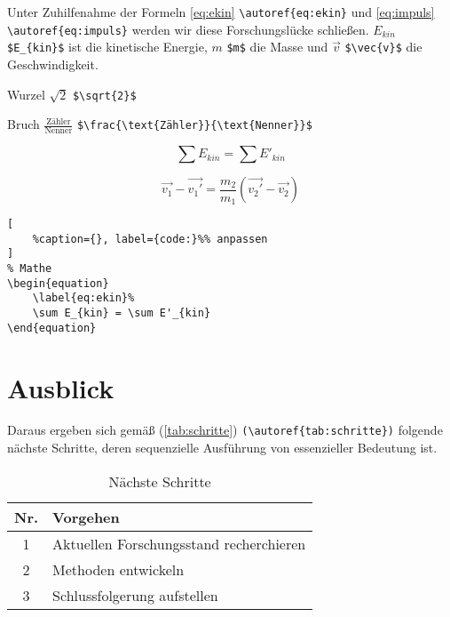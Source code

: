 Unter Zuhilfenahme der Formeln \autoref{eq:ekin} \verb|\autoref{eq:ekin}| und \autoref{eq:impuls} \verb|\autoref{eq:impuls}| werden wir 
diese Forschungslücke schließen.  
$E_{kin}$ \verb|$E_{kin}$| ist die kinetische Energie, $m$ \verb|$m$| die Masse und $\vec{v}$ \verb|$\vec{v}$| die Geschwindigkeit.

Wurzel $\sqrt{2}$ \verb|$\sqrt{2}$|

Bruch $\frac{\text{Zähler}}{\text{Nenner}}$ \verb|$\frac{\text{Zähler}}{\text{Nenner}}$|

\begin{equation}
	\label{eq:ekin}%
	\sum E_{kin} = \sum E'_{kin}
\end{equation}

\begin{equation}
	\label{eq:impuls}%
	\vec{v_1} - \vec{v_1'} = \frac{m_2}{m_1} (\vec{v_2'} - \vec{v_2})
\end{equation}

\lstset{language=TeX}%
\begin{lstlisting}[
	%caption={}, label={code:}%% anpassen
]
% Mathe
\begin{equation}
	\label{eq:ekin}% 
	\sum E_{kin} = \sum E'_{kin}
\end{equation}
\end{lstlisting}


\clearpage
\section*{Ausblick}

Daraus ergeben sich gemäß (\autoref{tab:schritte}) \verb|(\autoref{tab:schritte})| folgende nächste Schritte, 
deren sequenzielle Ausführung von essenzieller Bedeutung ist.

\begin{table}[!ht]%
	\centering
	\begin{tabular}{@{}cl@{}}%
		\toprule
		\textbf{Nr.} & \textbf{Vorgehen} \\
		\midrule
		1 & Aktuellen Forschungsstand recherchieren \\
		2 & Methoden entwickeln \\
		3 & Schlussfolgerung aufstellen \\
		\bottomrule
	\end{tabular}
	\caption{Nächste Schritte}\label{tab:schritte}
\end{table}

